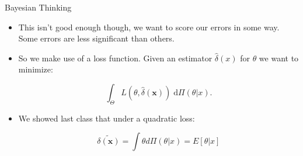 \documentclass[11pt]{beamer}
\begin{document}
\begin{frame}{Bayesian Thinking}

\begin{itemize}

\item This isn't good enough though, we want to score our errors in some way. Some errors are less significant than others.

\vfill

\item So we make use of a loss function. Given an estimator $\hat{\delta}(x)$ for $\theta$ we want to minimize:

$$\int_\Theta L(\theta,\hat{\delta}(\mathbf{x})) \;\text{d}\Pi(\theta|x).$$

\vfill

\item We showed last class that under a quadratic loss:

$$\widetilde{\delta(\mathbf{x})}= \int \theta d\Pi(\theta|x)=E[\theta|x]$$

\end{itemize}

\end{frame}
\end{document}
